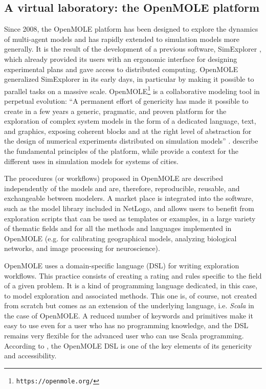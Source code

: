 \documentclass[10pt]{article}
\begin{document}
\subsection{A virtual laboratory: the OpenMOLE platform}


Since 2008, the OpenMOLE platform has been designed to explore the dynamics of multi-agent models \citep{reuillon2010declarative,reuillon2013openmole} and has rapidly extended to simulation models more generally. It is the result of the development of a previous software, SimExplorer \citep{amblard2003comprendre,deffuant2003demarche}, which already provided its users with an ergonomic interface for designing experimental plans and gave access to distributed computing. OpenMOLE generalized SimExplorer in its early days, in particular by making it possible to parallel tasks on a massive scale. OpenMOLE\footnote{\texttt{https://openmole.org/}} is a collaborative modeling tool in perpetual evolution: ``A permanent effort of genericity has made it possible to create in a few years a generic, pragmatic, and proven platform for the exploration of complex system models in the form of a dedicated language, text, and graphics, exposing coherent blocks and at the right level of abstraction for the design of numerical experiments distributed on simulation models'' \citep{schmitt2014modelisation}. \cite{reuillon2013openmole} describe the fundamental principles of the platform, while \cite{pumain2017urban} provide a context for the different uses in simulation models for systems of cities.


The procedures (or workflows) proposed in OpenMOLE are described independently of the models and are, therefore, reproducible, reusable, and exchangeable between modelers. A market place is integrated into the software, such as the model library included in NetLogo, and allows users to benefit from exploration scripts that can be used as templates or examples, in a large variety of thematic fields and for all the methods and languages implemented in OpenMOLE (e.g. for calibrating geographical models, analyzing biological networks, and image processing for neuroscience).

OpenMOLE uses a domain-specific language (DSL) \citep{van2002domain} for writing exploration workflows. This practice consists of creating a rating and rules specific to the field of a given problem. It is a kind of programming language dedicated, in this case, to model exploration and associated methods. This one is, of course, not created from scratch but comes as an extension of the underlying language, i.e. \textit{Scala} in the case of OpenMOLE. A reduced number of keywords and primitives make it easy to use even for a user who has no programming knowledge, and the DSL remains very flexible for the advanced user who can use Scala programming. According to \cite{passerat2017reproducible}, the OpenMOLE DSL is one of the key elements of its genericity and accessibility.
\end{document}
